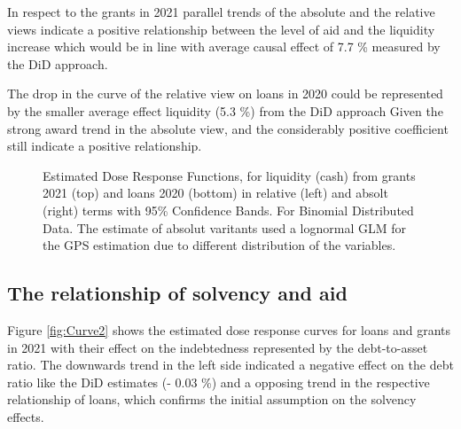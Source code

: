 In respect to the grants in 2021 parallel trends of the absolute and the relative views indicate a positive relationship between the level of aid and the liquidity increase which would be in line with average causal effect of 7.7 \% measured by the DiD approach. 

The drop in the curve of the relative view on loans in 2020 could be represented by the smaller average effect liquidity (5.3 \%) from the DiD approach Given the strong award trend in the absolute view, and the considerably positive coefficient still indicate a positive relationship.


\begin{figure}
    \centering
    
    \decoRule
    \caption[Response curves for grants and loans]{Estimated Dose Response Functions, for liquidity (cash) from grants 2021 (top) and loans 2020 (bottom) in relative (left) and absolt (right) terms with 95\% Confidence Bands. For Binomial Distributed Data. The estimate of absolut varitants used a lognormal GLM for the GPS estimation due to different distribution of the variables.}
    \label{fig:Curve1}
\end{figure}


\subsection{The relationship of solvency and aid}


Figure \ref{fig:Curve2} shows the estimated dose response curves for loans and grants in 2021 with their effect on the indebtedness represented by the debt-to-asset ratio.
The downwards trend in the left side indicated a negative effect on the debt ratio like the DiD estimates (- 0.03 \%) and a opposing trend in the respective relationship of loans, which confirms the initial assumption on the solvency effects.




